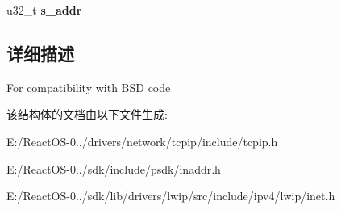 \begin{DoxyCompactItemize}
\begin{tabbing}
\end{tabbing}\item 
\mbox{\label{structin__addr_a0c76d44232bae90455a5189b32a9b625}} 
u32\+\_\+t {\bfseries s\+\_\+addr}
\end{DoxyCompactItemize}


\subsection{详细描述}
For compatibility with B\+SD code 

该结构体的文档由以下文件生成\+:\begin{DoxyCompactItemize}
\item 
E\+:/\+React\+O\+S-\/0../drivers/network/tcpip/include/tcpip.\+h\item 
E\+:/\+React\+O\+S-\/0../sdk/include/psdk/inaddr.\+h\item 
E\+:/\+React\+O\+S-\/0../sdk/lib/drivers/lwip/src/include/ipv4/lwip/inet.\+h\end{DoxyCompactItemize}
